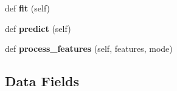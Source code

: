 \begin{DoxyCompactItemize}
def {\bfseries fit} (self)
\item 
\mbox{\label{classgr__ml_1_1gr__terrain__recognition_1_1coder_1_1Features2Image_a546deb8eb89a2f16e791df5440c8e3f6}} 
def {\bfseries predict} (self)
\item 
\mbox{\label{classgr__ml_1_1gr__terrain__recognition_1_1coder_1_1Features2Image_abd4312b085cba6fb0d73a4f0c5cbf75a}} 
def {\bfseries process\+\_\+features} (self, features, mode)
\end{DoxyCompactItemize}
\subsection*{Data Fields}
